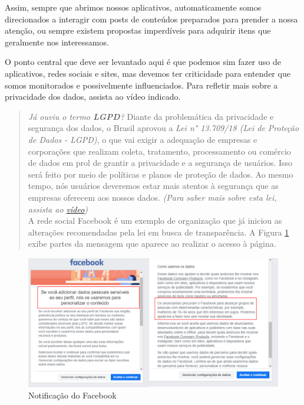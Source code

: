 \documentclass[
  portuguese,
  oneside]{book}
\begin{document}
Assim, sempre que abrimos nossos aplicativos, automaticamente somos direcionados a interagir com posts de conteúdos preparados para prender a nossa atenção, ou sempre existem propostas imperdíveis para adquirir itens que geralmente nos interessamos.

O ponto central que deve ser levantado aqui é que podemos sim fazer uso de aplicativos, redes sociais e sites, mas devemos ter criticidade para entender que somos monitorados e possivelmente influenciados. Para refletir mais sobre a privacidade dos dados, assista ao vídeo indicado.

\begin{quote}
\emph{Já ouviu o termo \textbf{LGPD}?}
Diante da problemática da privacidade e segurança dos dados, o Brasil aprovou a \emph{Lei n° 13.709/18 (Lei de Proteção de Dados - LGPD)}, o que vai exigir a adequação de empresas e corporações que realizam coleta, tratamento, processamento ou comércio de dados em prol de grantir a privacidade e a segurança de usuários. Isso será feito por meio de políticas e planos de proteção de dados. Ao mesmo tempo, nós usuários deveremos estar mais atentos à segurança que as empresas oferecem aos nossos dados. \emph{(Para saber mais sobre esta lei, assista ao \href{https://www.youtube.com/watch?v=fuuudzh1qEo}{vídeo})}\\
A rede social Facebook é um exemplo de organização que já iniciou as alterações recomendadas pela lei em busca de transparência. A Figura \ref{fig:figura4} exibe partes da mensagem que aparece ao realizar o acesso à página.
\end{quote}

\begin{figure}

{\centering \includegraphics[width=1\linewidth]{fig_cap1/facebook} 

}

\caption{Notificação do Facebook}\label{fig:figura4}
\end{figure}
\end{document}
